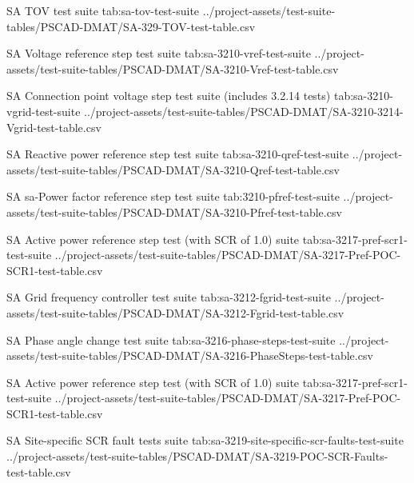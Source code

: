 \documentclass{../grid-link-report}
\newcommand{\projectassetsdir}{../project-assets}
\begin{document}
	{
		\fontsize{6}{8}\selectfont
		\autoscaledlongtable
		{SA TOV test suite}
		{tab:sa-tov-test-suite}
		{\projectassetsdir/test-suite-tables/PSCAD-DMAT/SA-329-TOV-test-table.csv}
	}
	
	{
		\fontsize{7}{9}\selectfont
		\autoscaledlongtable
		{SA Voltage reference step test suite}
		{tab:sa-3210-vref-test-suite}
		{\projectassetsdir/test-suite-tables/PSCAD-DMAT/SA-3210-Vref-test-table.csv}
	}
	
	{
		\fontsize{7}{9}\selectfont
		\autoscaledlongtable
		{SA Connection point voltage step test suite (includes 3.2.14 tests)}
		{tab:sa-3210-vgrid-test-suite}
		{\projectassetsdir/test-suite-tables/PSCAD-DMAT/SA-3210-3214-Vgrid-test-table.csv}
	}
	
	
	{
		\fontsize{7}{9}\selectfont
		\autoscaledlongtable
		{SA Reactive power reference step test suite}
		{tab:sa-3210-qref-test-suite}
		{\projectassetsdir/test-suite-tables/PSCAD-DMAT/SA-3210-Qref-test-table.csv}
	}
	
	{
		\fontsize{7}{9}\selectfont
		\autoscaledlongtable
		{SA sa-Power factor reference step test suite}
		{tab:3210-pfref-test-suite}
		{\projectassetsdir/test-suite-tables/PSCAD-DMAT/SA-3210-Pfref-test-table.csv}
	}
	
	{
		\fontsize{7}{9}\selectfont
		\autoscaledlongtable
		{SA Active power reference step test (with SCR of 1.0) suite}
		{tab:sa-3217-pref-scr1-test-suite}
		{\projectassetsdir/test-suite-tables/PSCAD-DMAT/SA-3217-Pref-POC-SCR1-test-table.csv}
	}
	
	{
		\fontsize{7}{9}\selectfont
		\autoscaledlongtable
		{SA Grid frequency controller test suite}
		{tab:sa-3212-fgrid-test-suite}
		{\projectassetsdir/test-suite-tables/PSCAD-DMAT/SA-3212-Fgrid-test-table.csv}
	}
	
	{
		\fontsize{7}{9}\selectfont
		\autoscaledlongtable
		{SA Phase angle change test suite}
		{tab:sa-3216-phase-steps-test-suite}
		{\projectassetsdir/test-suite-tables/PSCAD-DMAT/SA-3216-PhaseSteps-test-table.csv}
	}
	
	{
		\fontsize{7}{9}\selectfont
		\autoscaledlongtable
		{SA Active power reference step test (with SCR of 1.0) suite}
		{tab:sa-3217-pref-scr1-test-suite}
		{\projectassetsdir/test-suite-tables/PSCAD-DMAT/SA-3217-Pref-POC-SCR1-test-table.csv}
	}
	
	{
		\fontsize{5}{7}\selectfont
		\autoscaledlongtable
		{SA Site-specific SCR fault tests suite}
		{tab:sa-3219-site-specific-scr-faults-test-suite}
		{\projectassetsdir/test-suite-tables/PSCAD-DMAT/SA-3219-POC-SCR-Faults-test-table.csv}
	}
	
\end{document}
